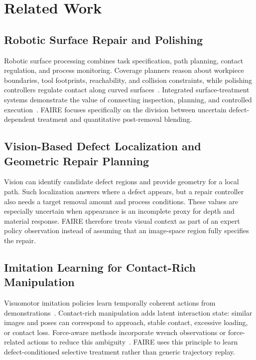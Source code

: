 \chapter{Related Work}
\label{chap:related_work}

\section{Robotic Surface Repair and Polishing}
Robotic surface processing combines task specification, path planning, contact regulation, and process monitoring. Coverage planners reason about workpiece boundaries, tool footprints, reachability, and collision constraints, while polishing controllers regulate contact along curved surfaces~\cite{schneyer2023segmentation,mcgovern2024coverage,mohsin2019path}. Integrated surface-treatment systems demonstrate the value of connecting inspection, planning, and controlled execution~\cite{alt2024robogrind,tafuro2024autonomous}. FAIRE focuses specifically on the division between uncertain defect-dependent treatment and quantitative post-removal blending.

\section{Vision-Based Defect Localization and Geometric Repair Planning}
Vision can identify candidate defect regions and provide geometry for a local path. Such localization answers where a defect appears, but a repair controller also needs a target removal amount and process conditions. These values are especially uncertain when appearance is an incomplete proxy for depth and material response. FAIRE therefore treats visual context as part of an expert policy observation instead of assuming that an image-space region fully specifies the repair.

\section{Imitation Learning for Contact-Rich Manipulation}
Visuomotor imitation policies learn temporally coherent actions from demonstrations~\cite{zhao2023act,chi2025diffusionpolicy}. Contact-rich manipulation adds latent interaction state: similar images and poses can correspond to approach, stable contact, excessive loading, or contact loss. Force-aware methods incorporate wrench observations or force-related actions to reduce this ambiguity~\cite{zhou2024admitdiff,liu2025forcemimic,he2025foar,yang2023momaforce}. FAIRE uses this principle to learn defect-conditioned selective treatment rather than generic trajectory replay.

